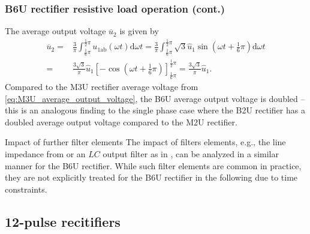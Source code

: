 \begin{frame}
    \frametitle{B6U rectifier resistive load operation (cont.)}
    The average output voltage $\overline{u}_2$ is given by
    \begin{equation}
        \begin{split}
            \overline{u}_2 =& \frac{3}{\pi} \int_{\frac{1}{6}\pi}^{\frac{1}{2}\pi} u_{1\mathrm{ab}}(\omega t) \mathrm{d} \omega t = \frac{3}{\pi} \int_{\frac{1}{6}\pi}^{\frac{1}{2}\pi} \sqrt{3}\hat{u}_1\sin(\omega t + \frac{1}{6}\pi) \mathrm{d} \omega t\\
            =& \frac{3\sqrt{3}}{\pi}\hat{u}_1 \left[-\cos(\omega t + \frac{1}{6}\pi)\right]_{\frac{1}{6}\pi}^{\frac{1}{2}\pi} = \frac{3\sqrt{3}}{\pi}\hat{u}_1.
        \end{split}
    \end{equation}
    Compared to the M3U rectifier average voltage from \eqref{eq:M3U_average_output_voltage}, the B6U average output voltage is doubled -- this is an analogous finding to the single phase case where the B2U rectifier has a doubled average output voltage compared to the M2U rectifier.
    \begin{varblock}{Impact of further filter elements}
        The impact of filters elements, e.g., the line impedance from  or an $LC$ output filter as in , can be analyzed in a similar manner for the B6U rectifier. While such filter elements are common in practice, they are not explicitly treated for the B6U rectifier in the following due to time constraints.
    \end{varblock}
\end{frame}

\subsection{12-pulse recitifiers} 

